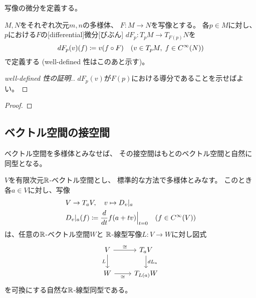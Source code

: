 \documentclass[report]{jlreq}
\begin{document}
\smooth 写像の微分を定義する。

\begin{definition}
    $M, N$をそれぞれ次元$m, n$の多様体、
    $F \colon M \to N$を\smooth 写像とする。
    各$p \in M$に対し、
    $p$における$F$の[differential]{微分}[びぶん]
    $dF_p \colon T_pM \to T_{F(p)}N$を
    \begin{equation}
        dF_p(v)(f)
            \coloneqq v(f \circ F)
            \quad
            (v \in T_pM, \; f \in C^\infty(N))
    \end{equation}
    で定義する (well-defined 性はこのあと示す)。
\end{definition}

\begin{proof}[well-defined 性の証明.]
    $dF_p(v)$が$F(p)$における導分であることを示せばよい。
    \TODO{}
\end{proof}

\begin{proposition}[チェインルール]
    \TODO{}
\end{proposition}

\begin{proof}
    \TODO{}
\end{proof}

\subsection{ベクトル空間の接空間}

ベクトル空間を多様体とみなせば、
その接空間はもとのベクトル空間と自然に同型となる。

\begin{proposition}[ベクトル空間とその接空間との自然な同型]
    $V$を有限次元$\mathbb{R}$-ベクトル空間とし、
    標準的な方法で多様体とみなす。
    このとき各$a \in V$に対し、写像
    \begin{alignat}{1}
        &V \to T_aV,
            \quad
            v \mapsto D_v|_a \\
        &D_v|_a(f)
            \coloneqq \dd{t} f(a + tv) \Big|_{t = 0}
            \quad (f \in \smooth(V))
    \end{alignat}
    は、任意の$\mathbb{R}$-ベクトル空間$W$と
    $\mathbb{R}$-線型写像$L \colon V \to W$に対し図式
    \begin{equation}
        \begin{tikzcd}
            V
                \ar{r}{\cong}
                \ar{d}[swap]{L}
                & T_aV
                    \ar{d}{dL_a} \\
            W
                \ar{r}[swap]{\cong}
                & T_{L(a)}W
        \end{tikzcd}
    \end{equation}
    を可換にする自然な$\mathbb{R}$-線型同型である。
\end{proposition}
\end{document}
